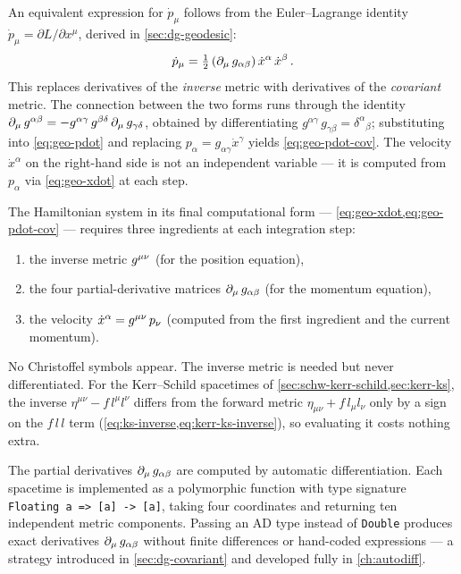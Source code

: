 An equivalent expression for $\dot{p}_\mu$ follows from the Euler--Lagrange
identity $\dot{p}_\mu = \partial L / \partial x^\mu$, derived in
\cref{sec:dg-geodesic}:
%
\begin{equation}
  \dot{p}_\mu = \tfrac{1}{2}\,(\partial_{\mu}\,g_{\alpha\beta})\,
    \dot{x}^\alpha\,\dot{x}^\beta \,.
  \label{eq:geo-pdot-cov}
\end{equation}
%
This replaces derivatives of the \emph{inverse} metric with derivatives of
the \emph{covariant} metric.  The connection between the two forms runs
through the identity
$\partial_{\mu}\,g^{\alpha\beta} =
-g^{\alpha\gamma}\,g^{\beta\delta}\,\partial_{\mu}\,g_{\gamma\delta}$, obtained
by differentiating $g^{\alpha\gamma}\,g_{\gamma\beta} =
\delta^\alpha{}_\beta$; substituting into \cref{eq:geo-pdot} and replacing
$p_\alpha = g_{\alpha\gamma}\dot{x}^\gamma$ yields
\cref{eq:geo-pdot-cov}.  The velocity $\dot{x}^\alpha$ on the right-hand
side is not an independent variable --- it is computed from $p_\alpha$ via
\cref{eq:geo-xdot} at each step.

The Hamiltonian system in its final computational form ---
\cref{eq:geo-xdot,eq:geo-pdot-cov} --- requires three ingredients at each
integration step:
%
\begin{enumerate}
\item the inverse metric $g^{\mu\nu}$ (for the position equation),
\item the four partial-derivative matrices $\partial_{\mu}\,g_{\alpha\beta}$
  (for the momentum equation),
\item the velocity $\dot{x}^\alpha = g^{\mu\nu}\,p_\nu$ (computed from
  the first ingredient and the current momentum).
\end{enumerate}
%
No Christoffel symbols appear.  The inverse metric is needed but never
differentiated.  For the Kerr--Schild spacetimes of
\cref{sec:schw-kerr-schild,sec:kerr-ks}, the inverse
$\eta^{\mu\nu} - f\,l^\mu l^\nu$ differs from the forward metric
$\eta_{\mu\nu} + f\,l_\mu l_\nu$ only by a sign on the $f\,l\,l$ term
(\cref{eq:ks-inverse,eq:kerr-ks-inverse}), so evaluating it costs nothing
extra.

The partial derivatives $\partial_{\mu}\,g_{\alpha\beta}$ are computed by
automatic differentiation.  Each spacetime is implemented as a polymorphic
function with type signature \texttt{Floating a => [a] -> [a]},
taking four coordinates and returning ten independent metric components.
Passing an AD type instead of \texttt{Double} produces exact derivatives
$\partial_{\mu}\,g_{\alpha\beta}$ without finite differences or hand-coded
expressions --- a strategy introduced in \cref{sec:dg-covariant} and
developed fully in \cref{ch:autodiff}.

